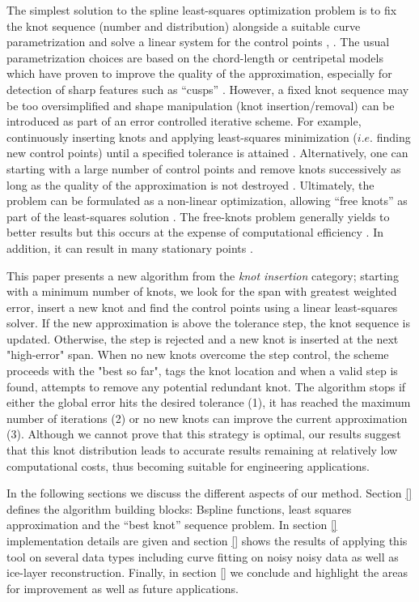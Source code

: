   The simplest solution to the spline least-squares optimization problem is to fix the 
  knot sequence (number and distribution) alongside a suitable curve parametrization and solve a linear system for the 
  control points \cite[Ch. 9.4]{nurbs_book}, \cite{deboor1968}. 
  The usual parametrization choices are based on the chord-length or centripetal models  which 
  have proven to improve the quality of the approximation, 
  especially for detection of sharp features such as ``cusps'' \cite{hoschek1988,speer1998,lee1989, ma1995}. 
  However,  a fixed knot sequence may be too oversimplified and 
  shape manipulation (knot insertion/removal) \cite{piegl1989, boehm1980, goldman1992} 
   can be introduced as part of an error controlled iterative scheme. For example, 
    continuously inserting knots and applying least-squares minimization 
   ($i.e.$ finding new control points) until a specified tolerance is attained
    \cite{piegl2000, park2007}. Alternatively, one can starting with a large number 
    of control points and remove knots successively as long as the 
     quality of the approximation is not destroyed \cite{lyche1987, tiller1992}. 
   Ultimately, the problem can be formulated as a non-linear optimization, allowing 
   ``free knots'' as part of the least-squares solution \cite{schwetlick1995least, beliakov2004}. 
   The free-knots problem generally yields to better results but this occurs at the expense 
   of computational efficiency \cite{randrzanarivony2002}. In addition, it can result 
   in many stationary points \cite{jupp1978}.
   
   This paper presents a new algorithm from the \emph{knot insertion} category; 
   starting with a minimum number of knots, we look for the span with greatest weighted error, 
   insert a new knot and find the control points using a linear least-squares solver. 
   If the new approximation is above the tolerance step, the knot sequence is updated. 
   Otherwise, the step is rejected and a new knot is inserted at the next  "high-error" span. 
   When no new knots overcome the step control, the scheme proceeds with the "best so far", 
   tags the knot location and when a valid step is found, 
   attempts to remove any potential redundant knot. 
    The algorithm stops if either the global error hits the desired tolerance (1), it has 
    reached the maximum number of iterations (2) or no new knots can 
    improve the current approximation (3). 
  Although we cannot prove that this strategy is optimal,
  our results suggest that this knot distribution leads to accurate results
  remaining at relatively low computational costs, thus becoming suitable  for engineering applications. 
  
   
   In the following sections we discuss the different aspects of our method. Section \ref{} defines 
   the algorithm building blocks: Bspline functions, 
   least squares approximation and the ``best knot'' sequence problem. 
   In section \ref{} implementation details are given and section 
   \ref{} shows the results of applying this tool on several data  types 
   including curve fitting on noisy noisy data as well as ice-layer reconstruction. 
   Finally,  in section \ref{}  we conclude and highlight the areas for improvement as well as future applications.
 